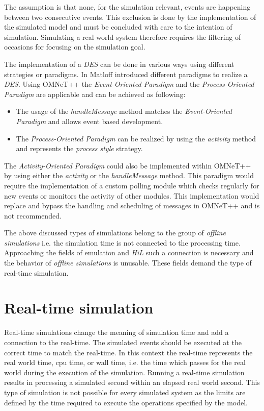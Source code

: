 The assumption is that none, for the simulation relevant, events are happening between two consecutive events.
This exclusion is done by the implementation of the simulated model and must be concluded with care to the intention of simulation.
Simulating a real world system therefore requires the filtering of occasions for focusing on the simulation goal. \cite[section 4.1.1]{omnet_manual}

The implementation of a \emph{DES} can be done in various ways using different strategies or paradigms.
In \cite[chapter 2]{matloff_introduction_2008} Matloff introduced different paradigms to realize a \emph{DES}.
Using OMNeT++ the \emph{Event-Oriented Paradigm} and the \emph{Process-Oriented Paradigm} are applicable and can be achieved as following:

\begin{itemize}
    \item The usage of the \emph{handleMessage} method matches the \emph{Event-Oriented Paradigm} and allows event based development.
    \item The \emph{Process-Oriented Paradigm} can be realized by using the \emph{activity} method and represents the \emph{process style} strategy.
\end{itemize}

\begin{sloppypar}
The \emph{Activity-Oriented Paradigm} could also be implemented within OMNeT++ by using either the \emph{activity} or the \emph{handleMessage} method.
This paradigm would require the implementation of a custom polling module which checks regularly for new events or monitors the activity of other modules.
This implementation would replace and bypass the handling and scheduling of messages in OMNeT++ and is not recommended. \cite[chapter 2.1]{matloff_introduction_2008}
\\
\end{sloppypar}

The above discussed types of simulations belong to the group of \emph{offline simulations} i.e. the simulation time is not connected to the processing time.
Approaching the fields of emulation and \emph{HiL} such a connection is necessary and the behavior of \emph{offline simulations} is unusable.
These fields demand the type of real-time simulation.  \cite[section III.B]{belanger_what_2010}

\section{Real-time simulation}
\label{sec:simulation_real_time}
Real-time simulations change the meaning of simulation time and add a connection to the real-time.
The simulated events should be executed at the correct time to match the real-time.
In this context the real-time represents the real world time, cpu time, or wall time, i.e. the time which passes for the real world during the execution of the simulation.
Running a real-time simulation results in processing a simulated second within an elapsed real world second.
This type of simulation is not possible for every simulated system as the limits are defined by the time required to execute the operations specified by the model.

